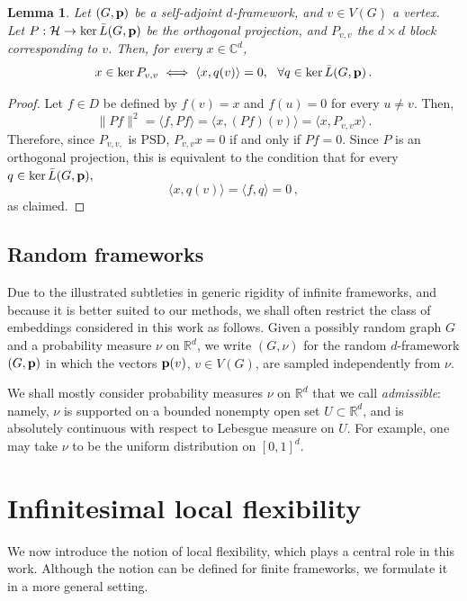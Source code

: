 \documentclass[reqno,english]{amsart}
\numberwithin{equation}{section}
\newtheorem{lemma}[theorem]{Lemma}
\theoremstyle{definition}{
\newtheorem{example}[theorem]{Example}
\newtheorem{definition}[theorem]{Definition}
\newtheorem*{definition*}{Definition}
\newtheorem{problem}[theorem]{Problem}
\newtheorem{question}[theorem]{Question}
}
\newcommand{\R}{\mathbb R}
\newcommand{\C}{\mathbb C}
\newcommand{\cH}{\mathcal H}
\newcommand{\p}{{\bf p}}
\begin{document}
\begin{lemma}\label{lem:forbidden_directions}
    Let $(G,\p)$ be a self-adjoint $d$-framework, and $v\in V(G)$ a vertex. Let $P:\cH\to\ker\bar L(G,\p)$ 
    be the orthogonal projection, and $P_{v,v}$ the $d\times d$ block corresponding to $v$. Then, for every $x\in \C^d$,
    \[
    x\in\ker P_{v,v} \iff \langle x,q(v)\rangle=0,~~\forall q\in\ker \bar L(G,\p)\,.
    \]
\end{lemma}
\begin{proof}
    Let $f\in D$ be defined by $f(v)=x$ and $f(u)=0$ for every $u\ne v$. Then,
    \[
    \|Pf\|^2 = \langle f,Pf\rangle = \langle x,(Pf)(v)\rangle = \langle x,P_{v,v}x\rangle\,.
    \]
    Therefore, since $P_{v,v,}$ is PSD, $P_{v,v}x=0$ if and only if $Pf=0$. Since $P$ is an orthogonal projection, this is equivalent to the condition that for every $q\in\ker \bar L(G,\p),$
    \[
    \langle x,q(v)\rangle = \langle f, q\rangle = 0\,,
    \]
    as claimed.
\end{proof}

\subsection{Random frameworks}\label{sec:admissible}
Due to the illustrated subtleties in generic rigidity of infinite frameworks, 
and because it is better suited to our methods, we shall often restrict the class of embeddings considered in this work as follows. 
Given a possibly random graph \(G\) and a probability measure \(\nu\) on
\(\R^d\), we write \((G,\nu)\) for the random \(d\)-framework \((G,\p)\)
in which the vectors \(\p(v)\), \(v\in V(G)\), are sampled independently
from \(\nu\).

We shall mostly consider probability measures \(\nu\) on \(\R^d\) that we
call \emph{admissible}: namely, \(\nu\) is supported on a bounded nonempty
open set \(U\subset\R^d\), and is absolutely continuous with respect to
Lebesgue measure on \(U\). For example, one may take \(\nu\) to be the
uniform distribution on \([0,1]^d\).


\section{Infinitesimal local flexibility}\label{sec:local_flex}
We now introduce the notion of local flexibility, which plays a central
role in this work. Although the notion can be defined for finite
frameworks, we formulate it in a more general setting.
\end{document}

